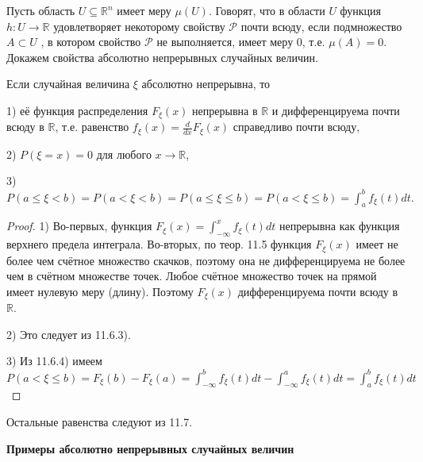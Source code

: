\begin{definition}
Пусть область $U \subseteq \mathbb{R}^n$ имеет меру $\mu(U )$. Говорят, что в области $U$ функция $h : U \to \mathbb{R}$ удовлетворяет некоторому свойству $\mathcal{P}$ почти всюду, если подмножество $A \subset U$ , в котором свойство $\mathcal{P}$ не выполняется, имеет меру 0, т.е. $\mu(A) = 0$.
Докажем свойства абсолютно непрерывных случайных величин.
\end{definition}

\begin{theorem}
Если случайная величина $\xi$ абсолютно непрерывна, то

1) её функция распределения $F_{\xi}(x)$ непрерывна в $\mathbb{R}$ и дифференцируема почти всюду в $\mathbb{R}$, т.е. равенство $f_{\xi}(x) = \frac{d}{dx}F_{\xi}(x)$ справедливо почти всюду,

2) $P(\xi = x) = 0$ для любого $x \to \mathbb{R}$,

3) $P(a \leq \xi < b) = P(a < \xi < b) = P(a \leq \xi \leq b) = P(a < \xi \leq b) = \int_{a}^{b}f_{\xi}(t)dt.$
\end{theorem}

\begin{proof}
1) Во-первых, функция $F_{\xi}(x) = \int_{-\infty}^{x}f_{\xi}(t)dt$ непрерывна как функция верхнего предела интеграла.
Во-вторых, по теор. 11.5 функция $F_{\xi}(x)$ имеет не более чем счётное множество скачков, поэтому она не дифференцируема не более чем в счётном
множестве точек. Любое счётное множество точек на прямой имеет нулевую меру (длину). Поэтому $F_{\xi}(x)$ дифференцируема почти всюду в $\mathbb{R}$.

2) Это следует из 11.6.3).

3) Из 11.6.4) имеем
$P(a < \xi \leq b) = F_{\xi}(b) - F_{\xi}(a) = \int_{-\infty}^{b}f_{\xi}(t)dt - \int_{-\infty}^{a}f_{\xi}(t)dt = \int_{a}^{b}f_{\xi}(t)dt$

\end{proof}
Остальные равенства следуют из 11.7.

\textbf{Примеры абсолютно непрерывных случайных величин}

